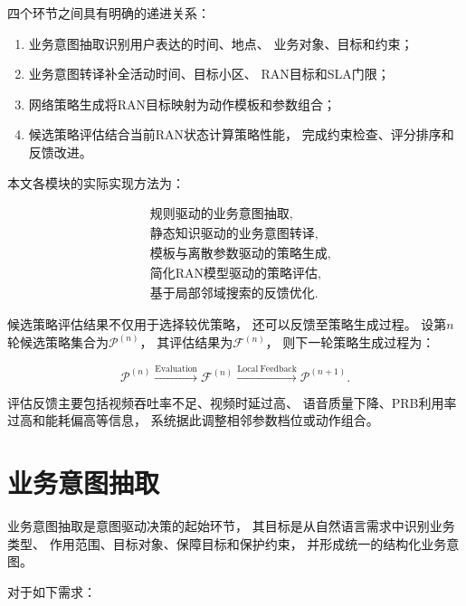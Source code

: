 \documentclass[lang=cn,12pt]{elegantbook}
\begin{document}
四个环节之间具有明确的递进关系：

\begin{enumerate}[label=\arabic*)]
    \item 业务意图抽取识别用户表达的时间、地点、
    业务对象、目标和约束；
    \item 业务意图转译补全活动时间、目标小区、
    RAN目标和SLA门限；
    \item 网络策略生成将RAN目标映射为动作模板和参数组合；
    \item 候选策略评估结合当前RAN状态计算策略性能，
    完成约束检查、评分排序和反馈改进。
\end{enumerate}

本文各模块的实际实现方法为：

\begin{equation}
\boxed{
\begin{aligned}
&\text{规则驱动的业务意图抽取},\\
&\text{静态知识驱动的业务意图转译},\\
&\text{模板与离散参数驱动的策略生成},\\
&\text{简化RAN模型驱动的策略评估},\\
&\text{基于局部邻域搜索的反馈优化}.
\end{aligned}
}
\label{eq:implemented_decision_methods}
\end{equation}

候选策略评估结果不仅用于选择较优策略，
还可以反馈至策略生成过程。
设第$n$轮候选策略集合为$\mathcal{P}^{(n)}$，
其评估结果为$\mathcal{F}^{(n)}$，
则下一轮策略生成过程为：

\begin{equation}
\mathcal{P}^{(n)}
\xrightarrow{\mathrm{Evaluation}}
\mathcal{F}^{(n)}
\xrightarrow{\mathrm{Local\ Feedback}}
\mathcal{P}^{(n+1)}.
\label{eq:policy_feedback_loop}
\end{equation}

评估反馈主要包括视频吞吐率不足、视频时延过高、
语音质量下降、PRB利用率过高和能耗偏高等信息，
系统据此调整相邻参数档位或动作组合。


\section{业务意图抽取}
\label{sec:business_intent_extraction}

业务意图抽取是意图驱动决策的起始环节，
其目标是从自然语言需求中识别业务类型、
作用范围、目标对象、保障目标和保护约束，
并形成统一的结构化业务意图。

对于如下需求：
\end{document}
